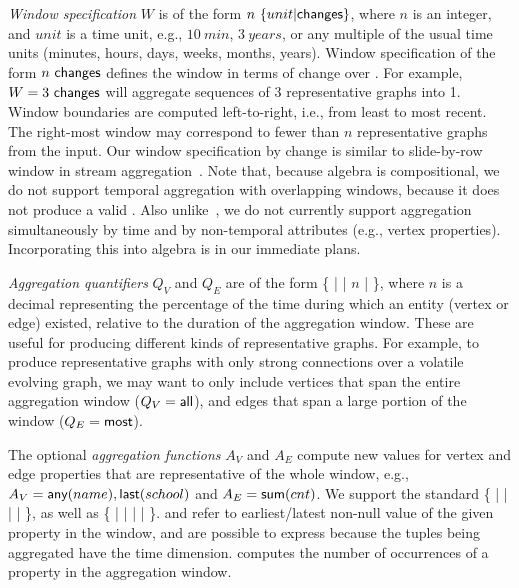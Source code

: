 {\em Window specification} $W$ is of the form
$n~\{unit|\textsf{changes}\}$, where $n$ is an integer, and $unit$ is a
time unit, e.g., $10~min$, $3~years$, or any multiple of the usual
time units (minutes, hours, days, weeks, months, years).  Window
specification of the form $n~\textsf{changes}$ defines the window in
terms of change over \trg.  For example,
$W=3~\textsf{changes}$ will aggregate sequences of 3 representative
graphs into 1.  Window boundaries are computed left-to-right, i.e.,
from least to most recent.  The right-most window may correspond to
fewer than $n$ representative graphs from the input.
%
Our window specification by change is similar to slide-by-row window
in stream aggregation~\cite{Li2005}.  Note that, because \tg algebra
is compositional, we do not support temporal aggregation with
overlapping windows, because it does not produce a valid \tg. Also
unlike~\cite{Li2005}, we do not currently support aggregation
simultaneously by time and by non-temporal attributes (e.g., vertex
properties). Incorporating this into \tg algebra is in our immediate
plans.

{\em Aggregation quantifiers} $Q_V$ and $Q_E$ are of the form \{
 |  |  $n$ |  \},
where $n$ is a decimal representing the percentage of the time during
which an entity (vertex or edge) existed, relative to the duration of
the aggregation window. These are useful for producing different kinds
of representative graphs.  For example, to produce representative
graphs with only strong connections over a volatile evolving graph, we
may want to only include vertices that span the entire aggregation
window ($Q_V=\textsf{all}$), and edges that span a large portion of the
window ($Q_E=\textsf{most}$).
 
The optional {\em aggregation functions} $A_V$ and $A_E$ compute new
values for vertex and edge properties that are representative of the
whole window, e.g., $A_V=\textsf{any}(name), \textsf{last}(school)$ and
$A_E=\textsf{sum}(cnt)$.
%
We support the standard \{  |  |  |
 |  \}, as well as \{  |
 |  |  |  \}.  
 and  refer to earliest/latest non-null value
of the given property in the window, and are possible to express
because the tuples being aggregated have the time dimension.
 computes the number of occurrences of a property in the
aggregation window.
 
